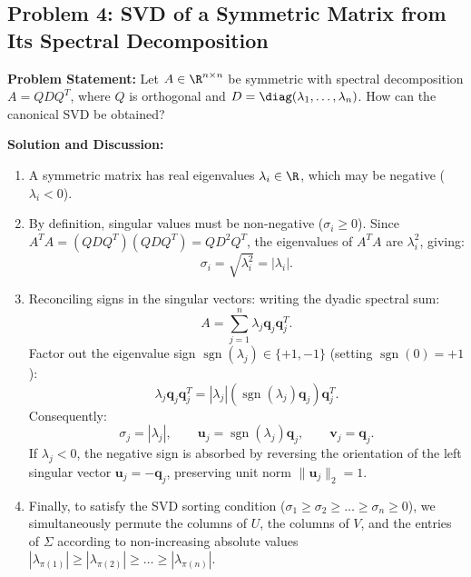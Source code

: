 \subsection{Problem 4: SVD of a Symmetric Matrix from Its Spectral Decomposition}

\begin{example}
\textbf{Problem Statement:} Let $A \in \R^{n \times n}$ be symmetric with spectral decomposition $A = Q D Q^T$, where $Q$ is orthogonal and $D = \diag(\lambda_1, \dots, \lambda_n)$. How can the canonical SVD be obtained?

\medskip
\textbf{Solution and Discussion:}
\begin{enumerate}
    \item A symmetric matrix has real eigenvalues $\lambda_i \in \R$, which may be negative ($\lambda_i < 0$).
    \item By definition, singular values must be non-negative ($\sigma_i \ge 0$). Since $A^T A = (Q D Q^T)(Q D Q^T) = Q D^2 Q^T$, the eigenvalues of $A^T A$ are $\lambda_i^2$, giving:
    \begin{equation}
        \sigma_i = \sqrt{\lambda_i^2} = |\lambda_i|.
    \end{equation}
    \item Reconciling signs in the singular vectors: writing the dyadic spectral sum:
    \begin{equation}
        A = \sum_{j=1}^n \lambda_j \mathbf{q}_j \mathbf{q}_j^T.
    \end{equation}
    Factor out the eigenvalue sign $\operatorname{sgn}(\lambda_j) \in \{+1, -1\}$ (setting $\operatorname{sgn}(0) = +1$):
    \begin{equation}
        \lambda_j \mathbf{q}_j \mathbf{q}_j^T = |\lambda_j| \left( \operatorname{sgn}(\lambda_j) \mathbf{q}_j \right) \mathbf{q}_j^T.
    \end{equation}
    Consequently:
    \begin{equation}
        \sigma_j = |\lambda_j|, \qquad \mathbf{u}_j = \operatorname{sgn}(\lambda_j) \mathbf{q}_j, \qquad \mathbf{v}_j = \mathbf{q}_j.
    \end{equation}
    If $\lambda_j < 0$, the negative sign is absorbed by reversing the orientation of the left singular vector $\mathbf{u}_j = -\mathbf{q}_j$, preserving unit norm $\|\mathbf{u}_j\|_2 = 1$.
    \item Finally, to satisfy the SVD sorting condition ($\sigma_1 \ge \sigma_2 \ge \dots \ge \sigma_n \ge 0$), we simultaneously permute the columns of $U$, the columns of $V$, and the entries of $\Sigma$ according to non-increasing absolute values $|\lambda_{\pi(1)}| \ge |\lambda_{\pi(2)}| \ge \dots \ge |\lambda_{\pi(n)}|$.
\end{enumerate}
\end{example}

